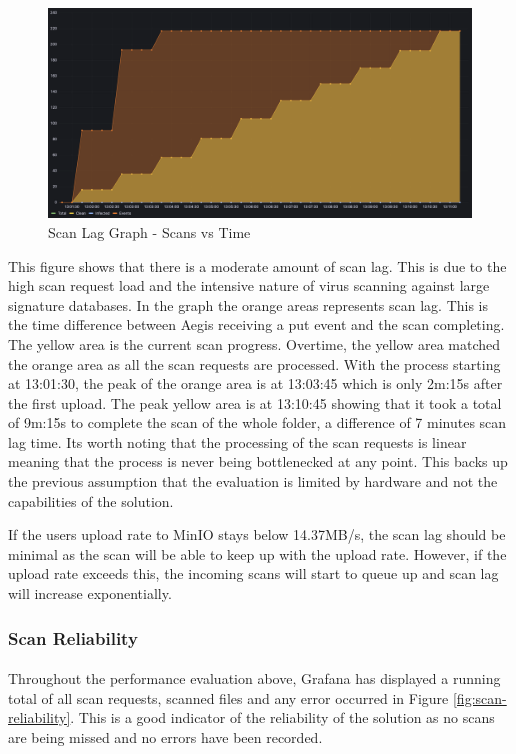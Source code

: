 \documentclass[12pt, conference, final, a4paper, onecolumn, compsoc]{IEEEtran}
\begin{document}
\begin{figure}[H]
  \centering \includegraphics[scale=0.31]{images/scan-lag.png}
  \caption{Scan Lag Graph - Scans vs Time}
  \label{fig:scan-lag}
\end{figure}

This figure shows that there is a moderate amount of scan lag. This is due to
the high scan request load and the intensive nature of virus scanning against
large signature databases. In the graph the orange areas represents scan lag.
This is the time difference between Aegis receiving a put event and the scan
completing. The yellow area is the current scan progress. Overtime, the yellow
area matched the orange area as all the scan requests are processed. With the
process starting at 13:01:30, the peak of the orange area is at 13:03:45 which
is only 2m:15s after the first upload. The peak yellow area is at 13:10:45 showing
that it took a total of 9m:15s to complete the scan of the whole folder, a
difference of 7 minutes scan lag time. Its worth noting that the processing of
the scan requests is linear meaning that the process is never being bottlenecked
at any point. This backs up the previous assumption that the evaluation is
limited by hardware and not the capabilities of the solution.

If the users upload rate to MinIO stays below 14.37MB/s, the scan lag should be
minimal as the scan will be able to keep up with the upload rate. However, if
the upload rate exceeds this, the incoming scans will start to queue up and scan
lag will increase exponentially.

\subsubsection*{Scan Reliability}
\paragraph{}
Throughout the performance evaluation above, Grafana has displayed a running
total of all scan requests, scanned files and any error occurred in Figure
\ref{fig:scan-reliability}. This is a good indicator of the reliability of the
solution as no scans are being missed and no errors have been recorded.
\end{document}
